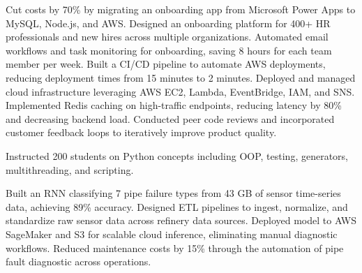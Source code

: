 %
%
%





Cut costs by 70\% by migrating an onboarding app from Microsoft Power Apps to MySQL, Node.js, and AWS.
Designed an onboarding platform for 400+ HR professionals and new hires across multiple organizations.
Automated email workflows and task monitoring for onboarding, saving 8 hours for each team member per week.
Built a CI/CD pipeline to automate AWS deployments, reducing deployment times from 15 minutes to 2 minutes.
Deployed and managed cloud infrastructure leveraging AWS EC2, Lambda, EventBridge, IAM, and SNS.
Implemented Redis caching on high-traffic endpoints, reducing latency by 80\% and decreasing backend load.
Conducted peer code reviews and incorporated customer feedback loops to iteratively improve product quality.


Instructed 200 students on Python concepts including OOP, testing, generators, multithreading, and scripting.


Built an RNN classifying 7 pipe failure types from 43 GB of sensor time-series data, achieving 89\% accuracy.
Designed ETL pipelines to ingest, normalize, and standardize raw sensor data across refinery data sources.
Deployed model to AWS SageMaker and S3 for scalable cloud inference, eliminating manual diagnostic workflows.
Reduced maintenance costs by 15\% through the automation of pipe fault diagnostic across operations.


